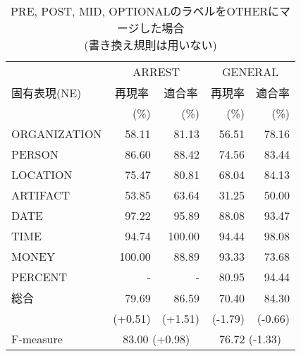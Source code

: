 {\begin{table*}[htbp]
  \begin{center}
    \caption{PRE, POST, MID, OPTIONALのラベルをOTHERにマージした場合\\
      (書き換え規則は用いない)}
    \label{Comparison3} 
    \begin{tabular}{|l|r@{ }r|r@{ }r|}
      \hline
      & \multicolumn{2}{c|}{ARREST} 
      & \multicolumn{2}{c|}{GENERAL}\\
      \cline{2-5}
      固有表現(NE) & \multicolumn{1}{c}{再現率} 
      & \multicolumn{1}{c|}{適合率} & \multicolumn{1}{c}{再現率} 
      & \multicolumn{1}{c|}{適合率} \\
      & (\%) & (\%) & (\%) & (\%) \\
      \hline      
      ORGANIZATION &  58.11 &  81.13 &  56.51 & 78.16 \\
      PERSON       &  86.60 &  88.42 &  74.56 & 83.44 \\
      LOCATION     &  75.47 &  80.81 &  68.04 & 84.13 \\
      ARTIFACT     &  53.85 &  63.64 &  31.25 & 50.00 \\
      DATE         &  97.22 &  95.89 &  88.08 & 93.47 \\
      TIME         &  94.74 & 100.00 &  94.44 & 98.08 \\
      MONEY        & 100.00 &  88.89 &  93.33 & 73.68 \\
      PERCENT      &      - &      - &  80.95 & 94.44 \\
      \hline
      総合 & 79.69 & 86.59 & 70.40 & 84.30 \\
      & (+0.51) & (+1.51) & (-1.79) & (-0.66) \\
      \hline
      \hline
      F-measure & \multicolumn{2}{c|}{83.00 (+0.98)} 
      & \multicolumn{2}{c|}{76.72 (-1.33)} \\
      \hline
    \end{tabular}
  \end{center}
\end{table*}
}

